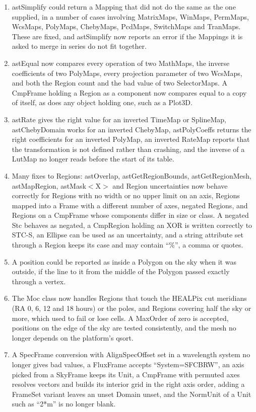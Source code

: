 \documentclass[twoside,11pt]{starlink}
\begin{document}
\begin{enumerate}
\item astSimplify could return a Mapping that did not do the same as the one supplied, in a number of cases involving MatrixMaps, WinMaps, PermMaps, WcsMaps, PolyMaps, ChebyMaps, PcdMaps, SwitchMaps and TranMaps.
  These are fixed, and astSimplify now reports an error if the Mappings it is asked to merge in series do not fit together.
\item astEqual now compares every operation of two MathMaps, the inverse coefficients of two PolyMaps, every projection parameter of two WcsMaps, and both the Region count and the bad value of two SelectorMaps.
  A CmpFrame holding a Region as a component now compares equal to a copy of itself, as does any object holding one, such as a Plot3D.
\item astRate gives the right value for an inverted TimeMap or SplineMap, astChebyDomain works for an inverted ChebyMap, astPolyCoeffs returns the right coefficients for an inverted PolyMap, an inverted RateMap reports that the transformation is not defined rather than crashing, and the inverse of a LutMap no longer reads before the start of its table.
\item Many fixes to Regions: astOverlap, astGetRegionBounds, astGetRegionMesh, astMapRegion, astMask$<$X$>$ and Region uncertainties now behave correctly for Regions with no width or no upper limit on an axis, Regions mapped into a Frame with a different number of axes, negated Regions, and Regions on a CmpFrame whose components differ in size or class.
  A negated Stc behaves as negated, a CmpRegion holding an XOR is written correctly to STC-S, an Ellipse can be used as an uncertainty, and a string attribute set through a Region keeps its case and may contain ``\%'', a comma or quotes.
\item A position could be reported as inside a Polygon on the sky when it was outside, if the line to it from the middle of the Polygon passed exactly through a vertex.
\item The Moc class now handles Regions that touch the HEALPix cut meridians (RA 0, 6, 12 and 18 hours) or the poles, and Regions covering half the sky or more, which used to fail or lose cells.
  A MaxOrder of zero is accepted, positions on the edge of the sky are tested consistently, and the mesh no longer depends on the platform's qsort.
\item A SpecFrame conversion with AlignSpecOffset set in a wavelength system no longer gives bad values, a FluxFrame accepts ``System=SFCBRW'', an axis picked from a SkyFrame keeps its Unit, a CmpFrame with permuted axes resolves vectors and builds its interior grid in the right axis order, adding a FrameSet variant leaves an unset Domain unset, and the NormUnit of a Unit such as ``2*m'' is no longer blank.

\end{enumerate}
\end{document}
